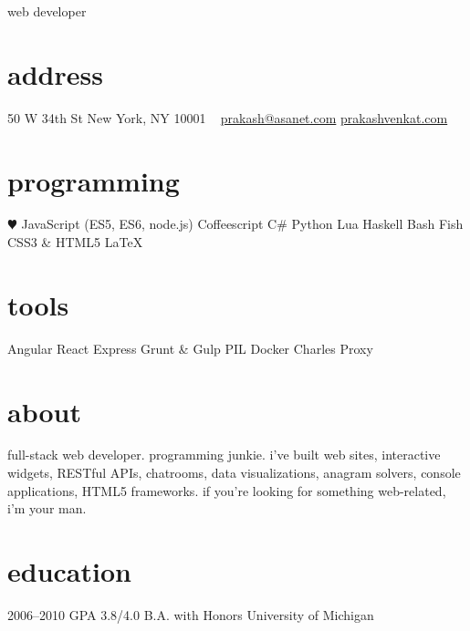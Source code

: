 \documentclass[]{friggeri-cv}
\begin{document}
       {web developer}


\begin{aside}
  \section{address}
    50 W 34th St
    New York, NY 10001
    ~
    \href{mailto:prakash@asanet.com}{prakash@asanet.com}
    \href{http://prakashvenkat.com}{prakashvenkat.com}
  \section{programming}
    {\color{red} $\varheartsuit$} JavaScript
    (ES5, ES6, node.js)
    Coffeescript
    C\#
    Python
    Lua
    Haskell
    Bash
    Fish
    CSS3 \& HTML5
    LaTeX
  \section{tools}
    Angular
    React
    Express
    Grunt \& Gulp
    PIL
    Docker
    Charles Proxy
\end{aside}

\section{about}
full-stack web developer. programming junkie. i've built web sites, interactive widgets,
RESTful APIs, chatrooms, data visualizations, anagram solvers, console applications, 
HTML5 frameworks. if you're looking for something web-related, i'm your man.

\section{education}

\begin{entrylist}
  \entry
    {2006–2010}
    {GPA 3.8/4.0}
    {B.A. with Honors}
    {University of Michigan}
\end{entrylist}
\end{document}
